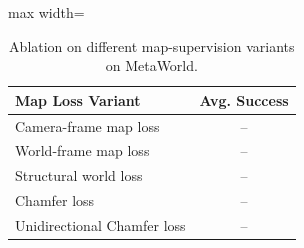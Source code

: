 \begin{table}[t]
\centering
\caption{Ablation on different map-supervision variants on MetaWorld.}
\label{tab:ablation_map_loss}
\small
\setlength{\tabcolsep}{8pt}
\begin{adjustbox}{max width=\columnwidth}
\begin{tabular}{l|c}
\toprule
Map Loss Variant & Avg. Success \\
\midrule
Camera-frame map loss & -- \\
World-frame map loss & -- \\
Structural world loss & -- \\
Chamfer loss & -- \\
Unidirectional Chamfer loss & -- \\
\bottomrule
\end{tabular}
\end{adjustbox}
\end{table}

